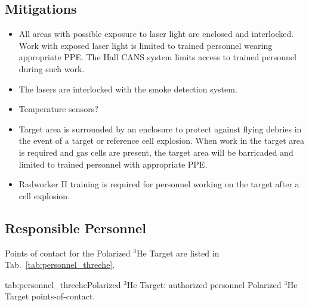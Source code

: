 \subsection{Mitigations}
\begin{itemize}
\item All areas with possible exposure to laser light are enclosed and
  interlocked.  Work with exposed laser light is limited to trained
  personnel wearing appropriate PPE.  The Hall CANS system limits
  access to trained personnel during such work.
\item The lasers are interlocked with the smoke detection system.
\item Temperature sensors?
\item Target area is surrounded by an enclosure to protect against flying
  debries in the event of a target or reference cell explosion.  When
work in the target area is required and gas cells are present, the
target area will be barricaded and limited to trained personnel with
appropriate PPE.
\item Radworker II training is required for personnel working on the
  target after a cell explosion.
\end{itemize}

\subsection{Responsible Personnel}

Points of contact for the Polarized ${}^3$He Target are listed in Tab.~\ref{tab:personnel_threehe}.

\begin{namestab}{tab:personnel_threehe}{Polarized ${}^3$He Target: authorized personnel}
   {Polarized ${}^3$He Target points-of-contact.}
  \ArunTadepalli{}
\end{namestab}
